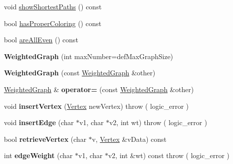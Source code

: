 \begin{DoxyCompactItemize}
\item 
void \hyperlink{class_weighted_graph_a91740718926ca2862726d297e7b28b7f}{show\+Shortest\+Paths} () const 
\item 
bool \hyperlink{class_weighted_graph_a60be8bab10a9142846093cb768855efd}{has\+Proper\+Coloring} () const 
\item 
bool \hyperlink{class_weighted_graph_a03884e32b9e093b10e3a44add7eaa928}{are\+All\+Even} () const 
\item 
\hypertarget{class_weighted_graph_acf8f5b4f212bc8daf4b12f0b88899180}{{\bfseries Weighted\+Graph} (int max\+Number=def\+Max\+Graph\+Size)}\label{class_weighted_graph_acf8f5b4f212bc8daf4b12f0b88899180}

\item 
\hypertarget{class_weighted_graph_a294fd717db213e761dc0eb65bbfcb7ab}{{\bfseries Weighted\+Graph} (const \hyperlink{class_weighted_graph}{Weighted\+Graph} \&other)}\label{class_weighted_graph_a294fd717db213e761dc0eb65bbfcb7ab}

\item 
\hypertarget{class_weighted_graph_a32c3057c0f746f427068be4a9b408845}{\hyperlink{class_weighted_graph}{Weighted\+Graph} \& {\bfseries operator=} (const \hyperlink{class_weighted_graph}{Weighted\+Graph} \&other)}\label{class_weighted_graph_a32c3057c0f746f427068be4a9b408845}

\item 
\hypertarget{class_weighted_graph_a164845f6fecf25a25f5f14f69d42d975}{void {\bfseries insert\+Vertex} (\hyperlink{class_weighted_graph_1_1_vertex}{Vertex} new\+Vertex)  throw ( logic\+\_\+error )}\label{class_weighted_graph_a164845f6fecf25a25f5f14f69d42d975}

\item 
\hypertarget{class_weighted_graph_ad5e4bb96c2b3b5ace4be251bb3b47621}{void {\bfseries insert\+Edge} (char $\ast$v1, char $\ast$v2, int wt)  throw ( logic\+\_\+error )}\label{class_weighted_graph_ad5e4bb96c2b3b5ace4be251bb3b47621}

\item 
\hypertarget{class_weighted_graph_add447f0f2354c8c776045bf3bec865d8}{bool {\bfseries retrieve\+Vertex} (char $\ast$v, \hyperlink{class_weighted_graph_1_1_vertex}{Vertex} \&v\+Data) const }\label{class_weighted_graph_add447f0f2354c8c776045bf3bec865d8}

\item 
\hypertarget{class_weighted_graph_a80b2b095e7a05df4841383d2067e4345}{int {\bfseries edge\+Weight} (char $\ast$v1, char $\ast$v2, int \&wt) const   throw ( logic\+\_\+error )}\label{class_weighted_graph_a80b2b095e7a05df4841383d2067e4345}


\end{DoxyCompactItemize}
